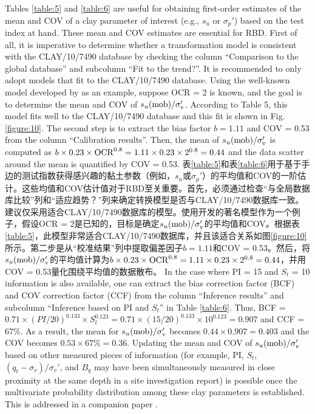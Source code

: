 \begin{Parallel}{0.60\textwidth}{}
    \ParallelLText
    {
        Tables \ref{table:5} and \ref{table:6} are useful for obtaining first-order estimates of the mean and COV of a clay parameter of interest (e.g., $s_u$ or $\sigma_p'$) based on the test index at hand. These mean and COV estimates are essential for RBD. First of all, it is imperative to determine whether a transformation model is consistent with the CLAY/10/7490 database by checking the column “Comparison to the global database” and subcolumn “Fit to the trend?”. It is recommended to only adopt models that fit to the CLAY/10/7490 database. Using the well-known model developed by \citet{Jamiolkowski198557} as an example, suppose OCR = 2 is known, and the goal is to determine the mean and COV of $s_u(\rm{mob})/\sigma_v'$. According to Table 5, this model fits well to the CLAY/10/7490 database and this fit is shown in Fig. \ref{figure:10}. The second step is to extract the bias factor $b = 1.11$ and COV = 0.53 from the column “Calibration results”. Then, the mean of $s_u(\rm{mob})/\sigma_v'$ is computed as $b\times{}0.23\times{}\rm{OCR}^{0.8}=1.11\times{}0.23\times{}2^{0.8}=0.44$ and the data scatter around the mean is quantified by COV = 0.53.
    }
    \ParallelRText
    {
        表\ref{table:5}和表\ref{table:6}用于基于手边的测试指数获得感兴趣的黏土参数（例如，$s_u$或$\sigma_p'$）的平均值和COV的一阶估计。这些均值和COV估计值对于RBD至关重要。首先，必须通过检查“与全局数据库比较”列和“适应趋势？”列来确定转换模型是否与CLAY/10/7490数据库一致。建议仅采用适合CLAY/10/7490数据库的模型。使用\citet{Jamiolkowski198557}开发的著名模型作为一个例子，假设OCR = 2是已知的，目标是确定$s_u(\rm{mob})/\sigma_v'$的平均值和COV。根据表\ref{table:5}，此模型非常适合CLAY/10/7490数据库，并且该适合关系如图\ref{figure:10}所示。第二步是从“校准结果”列中提取偏差因子$b = 1.11$和COV = 0.53。然后，将$s_u(\rm{mob})/\sigma_v'$的平均值计算为$b\times{}0.23\times{}\rm{OCR}^{0.8}=1.11\times{}0.23\times{}2^{0.8}=0.44$，并用COV = 0.53量化围绕平均值的数据散布。
    }
    \ParallelPar
    \ParallelLText
    {
        In the case where PI = 15 and $S_t$ = 10 information is also available, one can extract the bias correction factor (BCF) and COV correction factor (CCF) from the column “Inference results” and subcolumn “Inference based on PI and $S_t$” in Table \ref{table:6}. Thus, BCF = $0.71\times{}(PI/20)^{0.133}\times{}S_t^{0.123} = 0.71\times{}(15/20)^{0.133}\times{}10^{0.123} = 0.907$ and CCF = 67$\%$. As a result, the mean for $s_u(\rm{mob})/\sigma_v'$ becomes $0.44\times{}0.907 = 0.403$ and the COV becomes $0.53\times{}67\%= 0.36$. Updating the mean and COV of $s_u(\rm{mob})/\sigma_v'$ based on other measured pieces of information (for example, PI, $S_t$, $(q_t-\sigma_v)/\sigma_v'$, and $B_q$ may have been simultaneously measured in close proximity at the same depth in a site investigation report) is possible once the multivariate probability distribution among these clay parameters is established. This is addressed in a companion paper \citep{Ching2014686}.
}
\end{Parallel}
